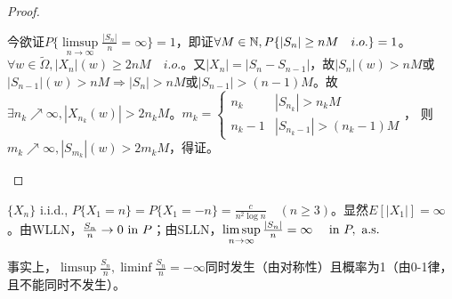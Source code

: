 \documentclass{ctexart}
\begin{document}
\begin{proof}
\begin{enumerate}
    今欲证$P\{\limsup\limits_{n\to\infty}\frac{|S_{n}|}{n}=\infty\}=1$，即证$\forall M\in\mathbb{N}, P\{|S_{n}|\geq nM\quad i.o.\}=1$。$\forall w\in\tilde\Omega, |X_{n}|(w)\geq 2nM\quad i.o.$。又$|X_{n}|=|S_{n}-S_{n-1}|$，故$|S_{n}|(w)>nM$或$|S_{n-1}|(w)>nM\Rightarrow |S_{n}|>nM$或$|S_{n-1}|>(n-1)M$。故$\exists n_{k}\nearrow \infty, |X_{n_{k}}(w)|>2n_{k}M$。$m_{k}=
    \begin{cases}
      n_{k}& |S_{n_{k}}|>n_{k}M\\ n_{k}-1 & |S_{n_{k}-1}|>(n_{k}-1)M
    \end{cases}
  $，
  则$m_{k}\nearrow \infty, |S_{m_{k}}|(w)>2m_{k}M$，得证。


  \end{enumerate}
  \end{proof}

\begin{Eg}[WLLN]
  $\{X_{n}\}$ i.i.d., $P\{X_{1}=n\}=P\{X_{1}=-n\}=\frac{c}{n^{2}\log n}\quad(n\geq 3)$。显然$E[|X_{1}|]=\infty$。由WLLN，$\frac{S_{n}}{n}\to 0\text{ in } P$；由SLLN，$\limsup\limits_{n\to\infty}\frac{|S_{n}|}{n}=\infty\quad \text{ in } P,\text{ a.s. }$

  事实上，$\limsup \frac{S_{n}}{n}, \liminf \frac{S_{n}}{n}=-\infty$同时发生（由对称性）且概率为1（由0-1律，且不能同时不发生）。
\end{Eg}
\end{document}
